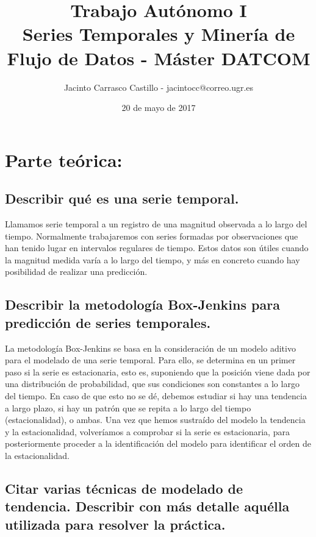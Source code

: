 \documentclass[11pt]{article}
\author{Jacinto Carrasco Castillo - jacintocc@correo.ugr.es}
\date{20 de mayo de 2017}
\title{Trabajo Autónomo I\\\medskip
\large Series Temporales y Minería de Flujo de Datos - Máster DATCOM}
\begin{document}
\maketitle


\section{Parte teórica:}
\label{sec:orge924f52}
\subsection{Describir qué es una serie temporal.}
\label{sec:org4830123}

Llamamos serie temporal a un registro de una magnitud observada a lo
largo del tiempo. Normalmente trabajaremos con series formadas por
observaciones que han tenido lugar en intervalos regulares de
tiempo. Estos datos son útiles cuando la magnitud medida varía a lo
largo del tiempo, y más en concreto cuando hay posibilidad de realizar
una predicción.

\subsection{Describir la metodología Box-Jenkins para predicción de series temporales.}
\label{sec:orgba20c6a}

La metodología Box-Jenkins se basa en la consideración de un modelo
aditivo para el modelado de una serie temporal. Para ello, se
determina en un primer paso si la serie es estacionaria, esto es,
suponiendo que la posición viene dada por una distribución de
probabilidad, que sus condiciones son constantes a lo largo del
tiempo. En caso de que esto no se dé, debemos estudiar si hay una
tendencia a largo plazo, si hay un patrón que se repita a lo largo del
tiempo (estacionalidad), o ambas. Una vez que hemos sustraído del
modelo la tendencia y la estacionalidad, volveríamos a comprobar si la
serie es estacionaria, para posteriormente proceder a la
identificación del modelo para identificar el orden de la estacionalidad.

\subsection{Citar varias técnicas de modelado de tendencia. Describir con más detalle aquélla utilizada para resolver la práctica.}
\label{sec:org2792eba}
\end{document}
